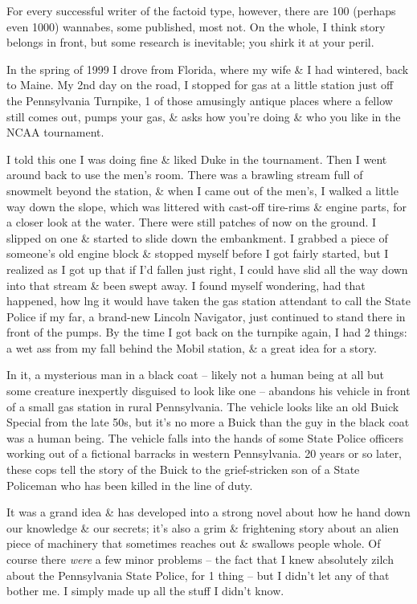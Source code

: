 \documentclass{article}
\numberwithin{equation}{section}
\begin{document}
For every successful writer of the factoid type, however, there are 100 (perhaps even 1000) wannabes, some published, most not. On the whole, I think story belongs in front, but some research is inevitable; you shirk it at your peril.

In the spring of 1999 I drove from Florida, where my wife \& I had wintered, back to Maine. My 2nd day on the road, I stopped for gas at a little station just off the Pennsylvania Turnpike, 1 of those amusingly antique places where a fellow still comes out, pumps your gas, \& asks how you're doing \& who you like in the NCAA tournament.

I told this one I was doing fine \& liked Duke in the tournament. Then I went around back to use the men's room. There was a brawling stream full of snowmelt beyond the station, \& when I came out of the men's, I walked a little way down the slope, which was littered with cast-off tire-rims \& engine parts, for a closer look at the water. There were still patches of now on the ground. I slipped on one \& started to slide down the embankment. I grabbed a piece of someone's old engine block \& stopped myself before I got fairly started, but I realized as I got up that if I'd fallen just right, I could have slid all the way down into that stream \& been swept away. I found myself wondering, had that happened, how lng it would have taken the gas station attendant to call the State Police if my far, a brand-new Lincoln Navigator, just continued to stand there in front of the pumps. By the time I got back on the turnpike again, I had 2 things: a wet ass from my fall behind the Mobil station, \& a great idea for a story.

In it, a mysterious man in a black coat -- likely not a human being at all but some creature inexpertly disguised to look like one -- abandons his vehicle in front of a small gas station in rural Pennsylvania. The vehicle looks like an old Buick Special from the late 50s, but it's no more a Buick than the guy in the black coat was a human being. The vehicle falls into the hands of some State Police officers working out of a fictional barracks in western Pennsylvania. 20 years or so later, these cops tell the story of the Buick to the grief-stricken son of a State Policeman who has been killed in the line of duty.

It was a grand idea \& has developed into a strong novel about how he hand down our knowledge \& our secrets; it's also a grim \& frightening story about an alien piece of machinery that sometimes reaches out \& swallows people whole. Of course there \textit{were} a few minor problems -- the fact that I knew absolutely zilch about the Pennsylvania State Police, for 1 thing -- but I didn't let any of that bother me. I simply made up all the stuff I didn't know.
\end{document}
